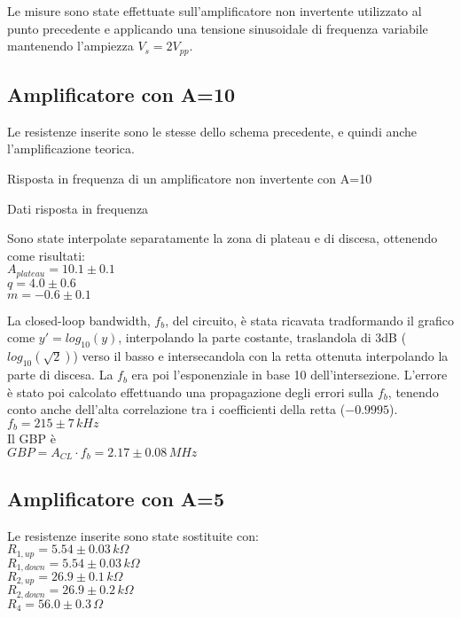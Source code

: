 Le misure sono state effettuate sull'amplificatore non invertente utilizzato al punto precedente e applicando una tensione sinusoidale 
di frequenza variabile mantenendo l'ampiezza $V_s= 2 V_{pp}$.

\subsection{Amplificatore con A=10}
Le resistenze inserite sono le stesse dello schema precedente, e quindi anche l'amplificazione teorica.

\begin{grafico}
 \centering 
  
 \caption{Risposta in frequenza di un amplificatore non invertente con A=10} 
 \label{gr:amp_noninv_A10.tex} 
\end{grafico}

\begin{tabella}
 \centering
  
 \caption{Dati risposta in frequenza}
 \label{tab:tab_noninv_A10.tex}
\end{tabella}

Sono state interpolate separatamente la zona di plateau e di discesa, ottenendo come risultati:\\
$A_{plateau}=10.1 \pm 0.1 $\\
$q = 4.0 \pm 0.6$\\
$m = -0.6 \pm 0.1$

La closed-loop bandwidth, $f_b$, del circuito, è stata ricavata tradformando il grafico come $y'=log_{10}(y)$, interpolando la parte costante, 
traslandola di 3dB ($log_{10}(\sqrt{2})$) verso il basso e intersecandola con la retta ottenuta interpolando la parte di discesa. La $f_b$ era poi l'esponenziale in base 10 dell'intersezione.
L'errore è stato poi calcolato effettuando una propagazione degli errori sulla $f_b$, tenendo conto anche dell'alta correlazione tra i coefficienti della retta ($-0.9995$).\\%
$f_b= 215 \pm 7 \,kHz $\\
Il GBP è\\
$GBP=A_{CL} \cdot f_b = 2.17 \pm 0.08 \,MHz$\\

\subsection{Amplificatore con A=5}
Le resistenze inserite sono state sostituite con:\\
$R_{1,up}=5.54 \pm 0.03\,k\Omega $\\ %
$R_{1,down}=5.54 \pm 0.03\,k\Omega$\\ %
$R_{2,up}=26.9 \pm 0.1\,k\Omega$\\ %
$R_{2,down}=26.9 \pm 0.2 \,k\Omega$\\
$R_4=56.0 \pm 0.3\,\Omega$

